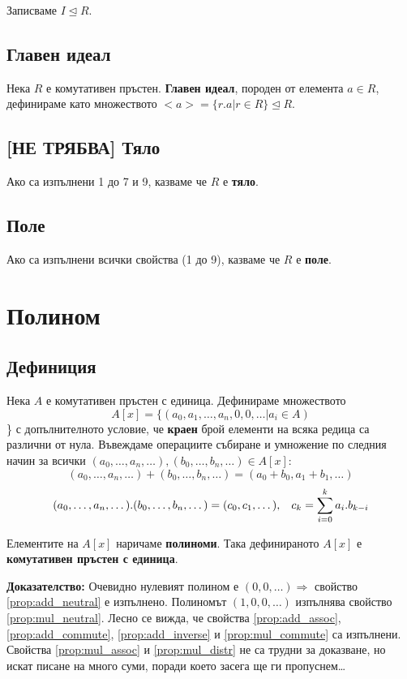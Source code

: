 \documentclass[fleqn,12pt]{article}
\begin{document}
Записваме $I \trianglelefteq R$.

\subsection{Главен идеал}
Нека $R$ е комутативен пръстен. \textbf{Главен идеал}, породен от елемента $a \in R$,
дефинираме като множеството $<a> = \{r.a | r \in R\} \trianglelefteq R$.

\subsection{[НЕ ТРЯБВА] Тяло}
Ако са изпълнени 1 до 7 и 9, казваме че $R$ е \textbf{тяло}.

\subsection{Поле}
Ако са изпълнени всички свойства (1 до 9), казваме че $R$ е \textbf{поле}.

\section{Полином}
\subsection{Дефиниция}
Нека $A$ е комутативен пръстен с единица.
Дефинираме множеството 
\[ A[x] = \{(a_0, a_1, \dots, a_n, 0, 0, \dots | a_i \in A) \] \}
с
допълнителното условие, че \textbf{краен} брой елементи на всяка редица са различни от нула.
Въвеждаме операциите събиране и умножение по следния начин за всички $(a_0, \dots, a_n, \dots), (b_0, \dots, b_n, \dots) \in A[x]$:
\[(a_0, \dots, a_n, \dots) + (b_0, \dots, b_n, \dots) = (a_0 + b_0, a_1 + b_1, \dots) \]
\[(a_0, \dots, a_n, \dots) . (b_0, \dots, b_n, \dots) = (c_0, c_1, \dots), \hspace{3mm}
c_k = \sum_{i=0}^{k} a_i . b_{k - i} \]

Елементите на $A[x]$ наричаме \textbf{полиноми}. Така дефинираното $A[x]$ е \textbf{комутативен пръстен с единица}.

\textbf{Доказателство:} Очевидно нулевият полином е $(0, 0, \dots) \Rightarrow$ свойство \ref{prop:add_neutral} е изпълнено.
Полиномът $(1, 0, 0, \dots)$ изпълнява свойство \ref{prop:mul_neutral}. Лесно се вижда, че свойства \ref{prop:add_assoc}, \ref{prop:add_commute}, 
\ref{prop:add_inverse} и \ref{prop:mul_commute} са изпълнени. Свойства \ref{prop:mul_assoc} и \ref{prop:mul_distr} не са трудни за доказване, 
но искат писане на много суми, поради което засега ще ги пропуснем\dots
\end{document}
